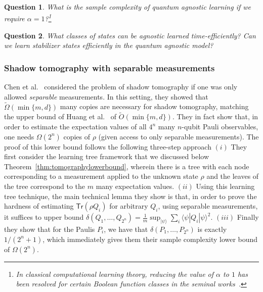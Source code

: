 \documentclass[11pt]{article}
\newcommand{\ket}[1]{|#1\rangle}
\newcommand{\Tr}{\textsf{Tr}}
\newtheorem{question}{Question}
\newcommand{\snote}[1]{\footnote{\textcolor{magenta}{(Srini: #1)}}}
\begin{document}
\begin{question}
 What is the sample complexity of quantum agnostic learning if we require $\alpha=1$?\footnote{In classical computational learning theory, reducing the value of $\alpha$ to $1$ has been resolved for certain Boolean function classes in the seminal works~\cite{DBLP:journals/jacm/LinialMN93,DBLP:conf/stoc/GopalanKK08}.}   \end{question}

\begin{question}
What classes of states can be agnostic learned time-efficiently? Can we learn stabilizer states efficiently in the quantum agnostic model?
 
\end{question}
 
\subsubsection{Shadow tomography with separable measurements} 
Chen et al.~\cite{DBLP:conf/focs/ChenCH021} considered the problem of shadow tomography if one was only allowed \emph{separable} measurements. In this setting, they showed that $\tilde{\Omega}(\min\{m,d\})$ many copies are necessary for shadow tomography,  matching the upper bound of Huang et al.~\cite{huangpreskill} of $\tilde{O}(\min\{m,d\})$. They in fact show that, in order to estimate the 
expectation values of all $4^n$ many $n$-qubit Pauli observables, one needs $\Omega(2^n)$ copies of $\rho$ (given access to only separable measurements). The proof of this lower bound follows the following three-step approach $(i)$ 
They first consider the learning tree framework that we discussed below Theorem~\ref{thm:tomographylowerbound}, wherein there is a tree with each node corresponding to a measurement applied to the unknown state $\rho$ and the leaves of the tree correspond to the $m$ many expectation values.
$(ii)$ Using this learning tree technique, the main technical lemma they show is that, in order to prove the hardness of estimating $\Tr(\rho Q_i)$ for arbitrary $Q_i$, using separable measurements, it suffices to upper bound $\delta(Q_1,\ldots,Q_{2^n})=\frac{1}{m}\sup_{\ket{\psi}}\sum_i \langle \psi|Q_i|\psi\rangle^2$. $(iii)$ Finally they show that for the Paulis $P_i$, we have that $\delta(P_1,\ldots,P_{2^n})$ is exactly $1/({2^n}+1)$, which immediately gives them their sample complexity lower bound of $\Omega(2^n)$. 
\end{document}
